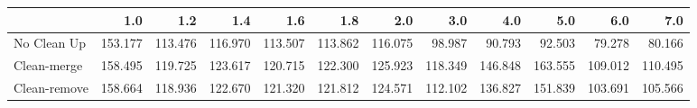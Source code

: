 \begin{tabular}{lrrrrrrrrrrr}
\toprule
{} &     1.0 &     1.2 &     1.4 &     1.6 &     1.8 &     2.0 &     3.0 &     4.0 &     5.0 &     6.0 &     7.0 \\
\midrule
No Clean Up  & 153.177 & 113.476 & 116.970 & 113.507 & 113.862 & 116.075 &  98.987 &  90.793 &  92.503 &  79.278 &  80.166 \\
Clean-merge  & 158.495 & 119.725 & 123.617 & 120.715 & 122.300 & 125.923 & 118.349 & 146.848 & 163.555 & 109.012 & 110.495 \\
Clean-remove & 158.664 & 118.936 & 122.670 & 121.320 & 121.812 & 124.571 & 112.102 & 136.827 & 151.839 & 103.691 & 105.566 \\
\bottomrule
\end{tabular}
